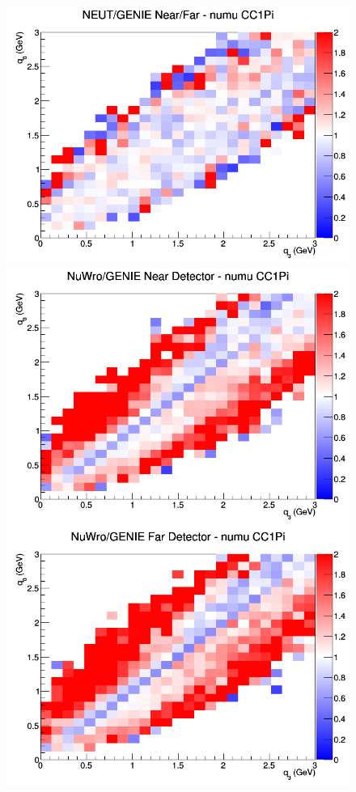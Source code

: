 \begin{figure}[h]
\endminipage
{}
\includegraphics[width=\linewidth]{eff_q0_q3/GAr/ratios/CC1Pi_NEUT_GENIE_numu_NF_q3_q0.png}
\endminipage
\newline
{}
\includegraphics[width=\linewidth]{eff_q0_q3/GAr/ratios/CC1Pi_NuWro_GENIE_numu_near_q3_q0.png}
\endminipage
{}
\includegraphics[width=\linewidth]{eff_q0_q3/GAr/ratios/CC1Pi_NuWro_GENIE_numu_far_q3_q0.png}

\end{figure}
